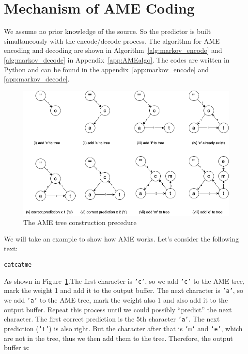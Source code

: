 \documentclass[12pt,twoside]{article}
\begin{document}
\section{Mechanism of AME Coding}
\label{sec:markov}


We assume no prior knowledge of the source. So the predictor is built simultaneously with the encode/decode process. The algorithm for AME encoding and decoding are shown in Algorithm~\ref{alg:markov_encode} and \ref{alg:markov_decode} in Appendix~\ref{app:AMEalgo}. The codes are written in Python and can be found in the appendix~\ref{app:markov_encode} and \ref{app:markov_decode}.

\begin{figure}[h!]
    \centering
    \includegraphics[width=\textwidth]{AMEtree.png}
    \caption{The AME tree construction precedure}
    \label{fig:AMEtree}
\end{figure}

We will take an example to show how AME works. Let's consider the following text:

\begin{lstlisting}[language=bash, style=custombash]
catcatme
\end{lstlisting}

As shown in Figure~\ref{fig:AMEtree}.The first character is \texttt{'c'}, so we add \texttt{'c'} to the AME tree, mark the weight 1 and add it to the output buffer. The next character is \texttt{'a'}, so we add \texttt{'a'} to the AME tree, mark the weight also 1 and also add it to the output buffer. Repeat this process until we could possibly ``predict'' the next character. The first correct prediction is the 5th character \texttt{'a'}. The next prediction (\texttt{'t'}) is also right. But the character after that is \texttt{'m'} and \texttt{'e'}, which are not in the tree, thus we then add them to the tree. Therefore, the output buffer is:
\end{document}
